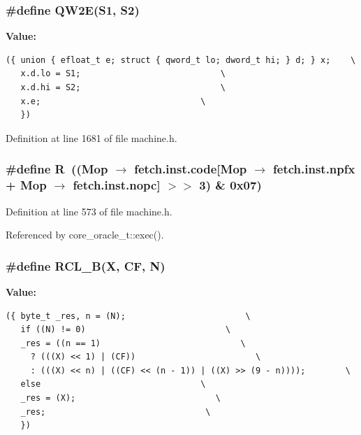 \subsubsection[{QW2E}]{\setlength{\rightskip}{0pt plus 5cm}\#define QW2E(S1, \/  S2)}\label{machine_8h_9fad2bff836f3e8fdbdad9948b851ca6}


\textbf{Value:}

\begin{Code}\begin{verbatim}({ union { efloat_t e; struct { qword_t lo; dword_t hi; } d; } x;    \
   x.d.lo = S1;                            \
   x.d.hi = S2;                            \
   x.e;                                \
   })
\end{verbatim}
\end{Code}


Definition at line 1681 of file machine.h.
\subsubsection[{R}]{\setlength{\rightskip}{0pt plus 5cm}\#define R~((Mop $\rightarrow$ fetch.inst.code[Mop $\rightarrow$ fetch.inst.npfx + Mop $\rightarrow$ fetch.inst.nopc] $>$$>$ 3) \& 0x07)}\label{machine_8h_5c71a5e59a53413cd6c270266d63b031}




Definition at line 573 of file machine.h.

Referenced by core\_\-oracle\_\-t::exec().
\subsubsection[{RCL\_\-B}]{\setlength{\rightskip}{0pt plus 5cm}\#define RCL\_\-B(X, \/  CF, \/  N)}\label{machine_8h_7c62ede99429390ab9ada588fb0ec102}


\textbf{Value:}

\begin{Code}\begin{verbatim}({ byte_t _res, n = (N);                        \
   if ((N) != 0)                            \
   _res = ((n == 1)                            \
     ? (((X) << 1) | (CF))                        \
     : (((X) << n) | ((CF) << (n - 1)) | ((X) >> (9 - n))));        \
   else                                \
   _res = (X);                            \
   _res;                                \
   })
\end{verbatim}
\end{Code}


